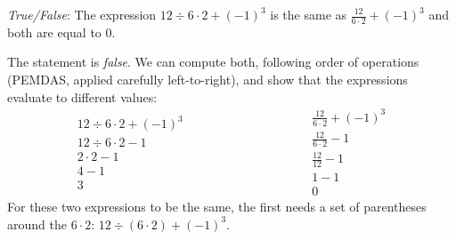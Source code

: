 \documentclass[11pt,letterpaper]{article}
\begin{document}
\thispagestyle{title}

\quizsol \textit{True/False}: The expression $12 \div 6 \cdot 2 + (-1)^3$ is the same as $\frac{12}{6 \cdot 2} + (-1)^3$ and both are equal to $0$. \pspace

\sol The statement is \textit{false}. We can compute both, following order of operations (PEMDAS, applied carefully left-to-right), and show that the expressions evaluate to different values:
	\[
	\begin{gathered}
	12 \div 6 \cdot 2 + (-1)^3 \\
	12 \div 6 \cdot 2 - 1 \\
	2 \cdot 2 - 1 \\
	4 - 1 \\
	3
	\end{gathered} \hspace{4cm}
	\begin{gathered}
	\tfrac{12}{6 \cdot 2} + (-1)^3 \\
	\tfrac{12}{6 \cdot 2} - 1 \\
	\tfrac{12}{12} - 1 \\
	1 - 1 \\
	0
	\end{gathered}
	\]
For these two expressions to be the same, the first needs a set of parentheses around the $6 \cdot 2$: $12 \div (6 \cdot 2) + (-1)^3$.
\end{document}
